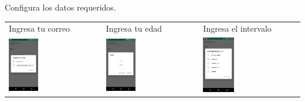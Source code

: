 {Configura los datos requeridos.
\begin{table}[h]
\begin{tabular}{lll}
\textsf{\relax 
Ingresa tu correo
} & \textsf{\relax 
Ingresa tu edad
} & \textsf{\relax 
Ingresa el intervalo
}\\
    {\includegraphics[width=0.33\textwidth]{anexos/graphics/app_email.jpg}}
 & 
    {\includegraphics[width=0.33\textwidth]{anexos/graphics/app_age.jpg}}
 & 
    {\includegraphics[width=0.33\textwidth]{anexos/graphics/app_int.jpg}}
\\
\end{tabular}
\end{table}


}
